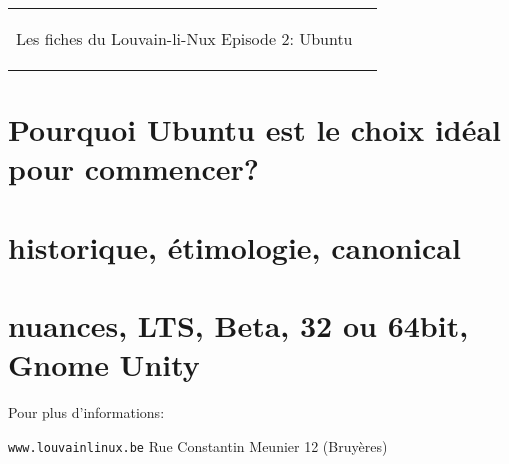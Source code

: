 



\begin{tabular}{p{13cm}r}
    \begin{center}{\Large Les fiches du Louvain-li-Nux\linebreak \linebreak
	\LARGE Episode 2: Ubuntu}\end{center}
		&
	\usebox{\logollnux}
\end{tabular}


\section*{Pourquoi Ubuntu est le choix idéal pour commencer?}



\section*{historique, étimologie, canonical}



\section*{nuances, LTS, Beta, 32 ou 64bit, Gnome Unity}



Pour plus d'informations:

\begin{center}\texttt{www.louvainlinux.be} \hspace{0.5cm}Rue Constantin Meunier 12 (Bruyères)\end{center}
                                                                                                                       
		